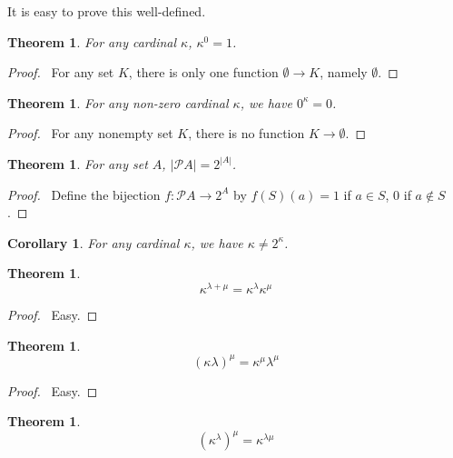 \documentclass{report}
\let\qed\relax
\newtheorem{theorem}[axiom]{Theorem}
\newtheorem{corollary}{Corollary}[axiom]
\theoremstyle{definition}
\begin{document}
    It is easy to prove this well-defined.

    \begin{theorem}
        For any cardinal $\kappa$, $\kappa^0 = 1$.
    \end{theorem}

    \begin{proof}
        \pf\ For any set $K$, there is only one function $\emptyset \rightarrow K$, namely $\emptyset$. \qed
    \end{proof}

    \begin{theorem}
        For any non-zero cardinal $\kappa$, we have $0^\kappa = 0$.
    \end{theorem}

    \begin{proof}
        \pf\ For any nonempty set $K$, there is no function $K \rightarrow \emptyset$. \qed
    \end{proof}

    \begin{theorem}
        For any set $A$, $|\mathcal{P} A| = 2^{|A|}$.
    \end{theorem}

    \begin{proof}
        \pf\ Define the bijection $f : \mathcal{P} A \rightarrow 2^A$ by $f(S)(a) = 1$ if $a \in S$,
        0 if $a \notin S$. \qed
    \end{proof}

    \begin{corollary}
        For any cardinal $\kappa$, we have $\kappa \neq 2^\kappa$.
    \end{corollary}

    \begin{theorem}
        \[ \kappa^{\lambda + \mu} = \kappa^\lambda \kappa^\mu \]
    \end{theorem}

    \begin{proof}
        \pf\ Easy. \qed
    \end{proof}

    \begin{theorem}
        \[ (\kappa \lambda)^\mu = \kappa^\mu \lambda^\mu \]
    \end{theorem}

    \begin{proof}
        \pf\ Easy. \qed
    \end{proof}

    \begin{theorem}
        \[ (\kappa^\lambda)^\mu = \kappa^{\lambda \mu} \]
    \end{theorem}
\end{document}
